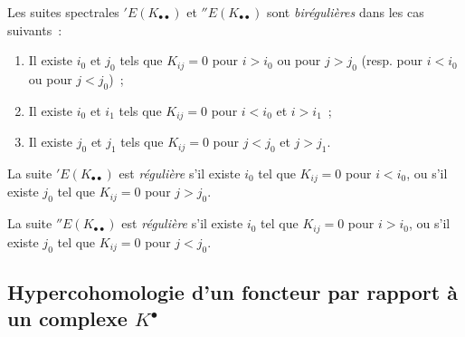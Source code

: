 \begin{env}[11.3.6]
\label{0.11.3.6-fr}
Les suites spectrales $'E(K_{\bullet\bullet})$ et
$''E(K_{\bullet\bullet})$ sont \emph{birégulières} dans les cas suivants~:
\begin{enumerate}
  \item[\textit{a)}] Il existe $i_0$ et $j_0$ tels que $K_{ij}=0$ pour $i>i_0$ ou
    pour $j>j_0$ (resp. pour $i<i_0$
    ou pour $j<j_0$)~;
  \item[\textit{b)}] Il existe $i_0$ et $i_1$ tels que $K_{ij}=0$ pour $i<i_0$ et
    $i>i_1$~;
  \item[\textit{c)}] Il existe $j_0$ et $j_1$ tels que $K_{ij}=0$ pour $j<j_0$ et
    $j>j_1$.
\end{enumerate}

La suite $'E(K_{\bullet\bullet})$ est \emph{régulière} s'il existe $i_0$ tel que
$K_{ij}=0$ pour $i<i_0$, ou s'il existe $j_0$ tel que $K_{ij}=0$ pour
$j>j_0$.

La suite $''E(K_{\bullet\bullet})$ est \emph{régulière} s'il existe $i_0$ tel que
$K_{ij}=0$ pour $i>i_0$, ou s'il existe $j_0$ tel que $K_{ij}=0$ pour
$j<j_0$.
\end{env}

\subsection{Hypercohomologie d'un foncteur par rapport à un complexe
$K^\bullet$}
\label{subsection:0.11.4-fr}

